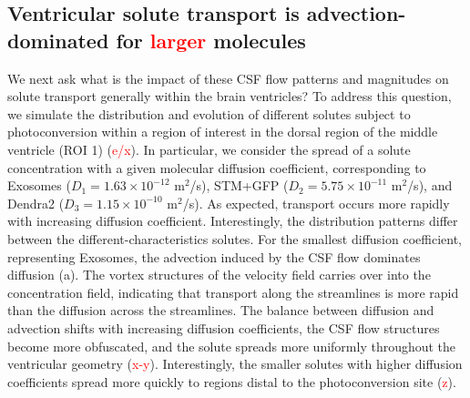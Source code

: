 \documentclass[fleqn]{wlscirep}
\newcommand{\fixme}[1]{\textcolor{red}{#1}}
\begin{document}
\subsection*{Ventricular solute transport is advection-dominated for \fixme{larger} molecules}
We next ask what is the impact of these CSF flow patterns and
magnitudes on solute transport generally within the brain ventricles?
To address this question, we simulate the distribution and evolution
of different solutes subject to photoconversion within a region of
interest in the dorsal region of the middle ventricle (ROI 1)
(\fixme{e/x}). In particular, we consider the spread of
a solute concentration with a given molecular diffusion coefficient,
corresponding to Exosomes ($D_1 = 1.63 \times 10^{-12}$ m$^2$/s),
STM+GFP ($D_2 = 5.75 \times 10^{-11}$ m$^2$/s), and Dendra2 ($D_3 =
1.15 \times 10^{-10}$ m$^2$/s). As expected, transport occurs more
rapidly with increasing diffusion coefficient. Interestingly, the
distribution patterns differ between the different-characteristics
solutes. For the smallest diffusion coefficient, representing
Exosomes, the advection induced by the CSF flow dominates diffusion
(a). The vortex structures of the velocity field
carries over into the concentration field, indicating that transport
along the streamlines is more rapid than the diffusion across the
streamlines. The balance between diffusion and advection shifts with
increasing diffusion coefficients, the CSF flow structures become more
obfuscated, and the solute spreads more uniformly throughout the
ventricular geometry (\fixme{x-y}). Interestingly, the
smaller solutes with higher diffusion coefficients spread more quickly
to regions distal to the photoconversion site (\fixme{z}).
\end{document}
